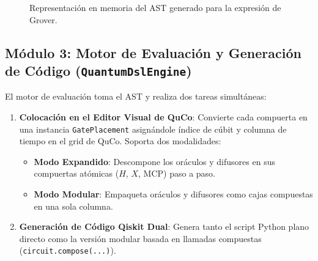 \documentclass[11pt,a4paper]{article}
\begin{document}
\begin{figure}[H]
\centering
{}
\caption{Representación en memoria del AST generado para la expresión de Grover.}
\label{fig:ast_diagram}
\end{figure}

\subsection{Módulo 3: Motor de Evaluación y Generación de Código (\texttt{QuantumDslEngine})}
El motor de evaluación toma el AST y realiza dos tareas simultáneas:
\begin{enumerate}
    \item \textbf{Colocación en el Editor Visual de QuCo}:
    Convierte cada compuerta en una instancia \texttt{GatePlacement} asignándole índice de cúbit y columna de tiempo en el grid de QuCo. Soporta dos modalidades:
    \begin{itemize}
        \item \textbf{Modo Expandido}: Descompone los oráculos y difusores en sus compuertas atómicas ($H$, $X$, $\text{MCP}$) paso a paso.
        \item \textbf{Modo Modular}: Empaqueta oráculos y difusores como cajas compuestas en una sola columna.
    \end{itemize}
    \item \textbf{Generación de Código Qiskit Dual}:
    Genera tanto el script Python plano directo como la versión modular basada en llamadas compuestas (\texttt{circuit.compose(...)}).
\end{enumerate}
\end{document}
